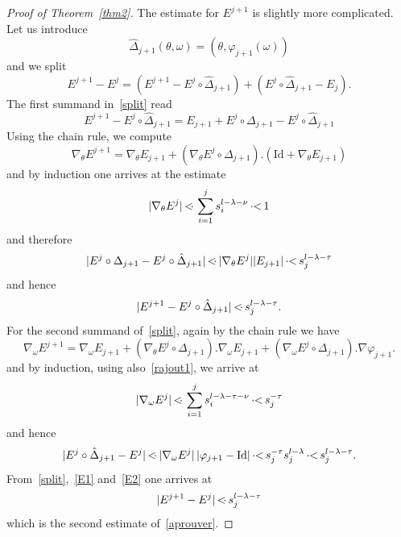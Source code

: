 \documentclass[JEP,XML,SOM,Unicode]{cedram}
\numberwithin{equation}{section}
\theoremstyle{plain}
\theoremstyle{definition}
\newcommand\MP{\,{<\hspace{-.5em}\cdot}\,}
\newcommand\PM{\,{\cdot\hspace{-.3em}<}\,}
\begin{document}
\begin{proof}[Proof of Theorem~\ref{thm2}]
The estimate for $E^{j+1}$ is slightly more complicated. Let us introduce
\[ \hat{\Delta}_{j+1}(\theta,\omega)=(\theta,\varphi_{j+1}(\omega)) \]
and we split
\begin{equation}\label{split}
E^{j+1}-E^{j}=(E^{j+1}-E^j \circ \hat{\Delta}_{j+1})+(E^j \circ \hat{\Delta}_{j+1}-E_j).
\end{equation}
The first summand in~\eqref{split} read
\[ E^{j+1}-E^j \circ \hat{\Delta}_{j+1}=E_{j+1}+E^j \circ \Delta_{j+1}-E^j \circ \hat{\Delta}_{j+1} \]
Using the chain rule, we compute
\[ \nabla_\theta E^{j+1}=\nabla_\theta E_{j+1}+(\nabla_\theta E^{j} \circ \Delta_{j+1}).(\mathrm{Id}+\nabla_\theta E_{j+1}) \]
and by induction one arrives at the estimate
\begin{equation}\label{rajout1}
|\nabla_\theta E^j| \MP \sum_{i=1}^j s_i^{l-\lambda-\nu} \PM 1
\end{equation}
and therefore
\[ |E^j \circ \Delta_{j+1}-E^j \circ \hat{\Delta}_{j+1}| \MP |\nabla_\theta E^j||E_{j+1}| \PM s_j^{l-\lambda-\tau} \]
and hence
\begin{equation}\label{E1}
|E^{j+1}-E^j \circ \hat{\Delta}_{j+1}| \MP s_j^{l-\lambda-\tau}.
\end{equation}
For the second summand of~\eqref{split}, again by the chain rule we have
\[ \nabla_\omega E^{j+1}=\nabla_\omega E_{j+1}+(\nabla_\theta E^{j} \circ \Delta_{j+1}).\nabla_\omega E_{j+1}+(\nabla_\omega E^{j} \circ \Delta_{j+1}).\nabla \varphi_{j+1}. \]
and by induction, using also~\eqref{rajout1}, we arrive at
\begin{equation*}
|\nabla_\omega E^j| \MP \sum_{i=1}^j s_i^{l-\lambda-\tau-\nu} \PM s_j^{-\tau}
\end{equation*}
and hence
\begin{equation}\label{E2}
|E^j \circ \hat{\Delta}_{j+1}-E^j| \MP |\nabla_\omega E^j|\,|\varphi_{j+1}-\mathrm{Id}| \PM s_j^{-\tau} s_j^{l-\lambda} \PM s_j^{l-\lambda-\tau} .
\end{equation}
From~\eqref{split},~\eqref{E1} and~\eqref{E2} one arrives at
\[ |E^{j+1} -E^j| \MP s_j^{l-\lambda-\tau} \]
which is the second estimate of~\eqref{aprouver}.


\end{proof}
\end{document}
